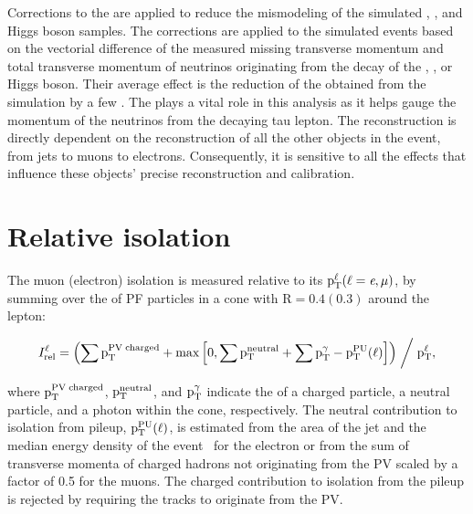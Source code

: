 Corrections to the \ptvecmiss are applied to reduce the mismodeling of the simulated \PZ, \PW, and Higgs boson samples. The corrections are applied to the simulated events based on the vectorial difference of the measured missing transverse momentum and total transverse momentum of neutrinos originating from the decay of the \PZ, \PW, or Higgs boson. Their average effect is the reduction of the \ptmiss obtained from the simulation by a few \GeV. The \ptvecmiss plays a vital role in this analysis as it helps gauge the momentum of the neutrinos from the decaying tau lepton. The \ptvecmiss reconstruction is directly dependent on the reconstruction of all the other objects in the event, from jets to muons to electrons. Consequently, it is sensitive to all the effects that influence these objects' precise reconstruction and calibration.


\section{Relative isolation}
\label{isolation}
The muon (electron) isolation is measured relative to its $\text{p}_\text{T}^\ell (\ell=\textit{e},\mu)$, by summing over the \pt of PF particles in a cone with $\text{R}=0.4(0.3)$ around the lepton:
\begin{linenomath*}
  \begin{equation*}
    I^\ell_{\text{rel}} = \left( \sum \text{p}_\text{T}^{\text{PV\;charged}} + \text{max}\left[0, \sum \text{p}_\text{T}^{\text{neutral}} + \sum \text{p}_\text{T}^\gamma - \text{p}_\text{T}^{\text{PU}}(\ell)\right]\right) \biggm/ \text{p}_\text{T}^\ell,
  \end{equation*}
\end{linenomath*}
where $\text{p}_\text{T}^{\text{PV\;charged}}$, $\text{p}_\text{T}^\text{neutral}$, and $\text{p}_\text{T}^{\gamma}$ indicate the \pt of a charged particle, a neutral particle, and a photon within the cone, respectively. The neutral contribution to isolation from pileup, $\text{p}_\text{T}^\text{PU}(\ell)$, is estimated from the area of the jet and the median energy density of the event~\cite{Cacciari:2008gn, Cacciari:2007fd} for the electron or from the sum of transverse momenta of charged hadrons not originating from the PV scaled by a factor of 0.5 for the muons. The charged contribution to isolation from the pileup is rejected by requiring the tracks to originate from the PV.
